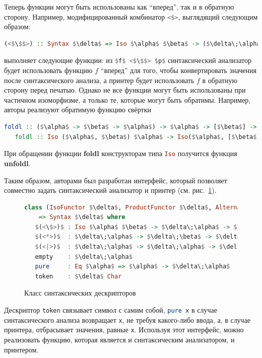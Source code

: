 Теперь функции могут быть использованы как ``вперед'', так и в обратную сторону. Например, модифицированный комбинатор 
\lstinline[language=Haskell]{<$>}, выглядящий следующим образом:

\begin{lstlisting}[language=Haskell,mathescape]
   (<$\$$>) :: Syntax $\delta$ => Iso $\alpha$ $\beta$ -> ($\delta\;\alpha$ -> $\delta\;\beta$)
\end{lstlisting}

\noindent выполняет следующие функции: из \lstinline[language=Haskell,mathescape]{$f$ <$\$$> $p$} синтаксический анализатор будет 
использовать функцию $f$ ``вперед'' для того, чтобы конвертировать значения после синтаксического анализа, а принтер будет использовать 
$f$ в обратную сторону перед печатью. Однако не все функции могут быть использованы при частичном изоморфизме, а только те, 
которые могут быть обратимы. Например, авторы реализуют обратимую функцию свёртки

\begin{lstlisting}[mathescape,language=Haskell]
   foldl :: ($\alpha$ -> $\beta$ -> $\alpha$) -> $\alpha$ -> [$\beta$] -> $\alpha$
   foldl :: Iso ($\alpha$, $\beta$) $\alpha$ -> Iso($\alpha$, [$\beta$]) $\alpha$
\end{lstlisting}

При обращении функции \textbf{foldl} конструкторам типа \lstinline[language=Haskell]{Iso} получится функция \textbf{unfoldl}.

Таким образом, авторами был разработан интерфейс, который позволяет совместно задать синтаксический анализатор и принтер (см. рис.~\ref{ClassSyntDesc}).

\begin{figure}[ht]
\centering
\begin{lstlisting}[mathescape,language = haskell]
class (IsoFunctor $\delta$, ProductFunctor $\delta$, Alternative $\delta$) 
    => Syntax $\delta$ where
   $(<\$>)$ : Iso $\alpha$ $\beta$ -> $\delta\;\alpha$ -> $\delta\;\beta$
   $(<*>)$  : $\delta\;\alpha$ -> $\delta\;\beta$ -> $\delta$ ($\alpha$, $\beta$)
   $(<|>)$  : $\delta\;\alpha$ -> $\delta\;\alpha$ -> $\delta\;\alpha$
   empty    : $\delta\;\alpha$
   pure     : Eq $\alpha$ => $\alpha$ -> $\delta\;\alpha$
   token    : $\delta$ Char
\end{lstlisting}
\caption{Класс синтаксических дескрипторов}
\label{ClassSyntDesc}
\end{figure}

Дескриптор \lstinline[language=Haskell]{token} связывает символ с самим собой, \lstinline[language=Haskell]{pure x} 
в случае синтаксического анализа возвращает \lstinline[language=Haskell]{x}, не требуя какого-либо ввода, а, в случае 
принтера, отбрасывает значения, равные \lstinline[language=Haskell]{x}. Используя этот интерфейс, можно 
реализовать функцию, которая является и синтаксическим анализатором, и принтером.

